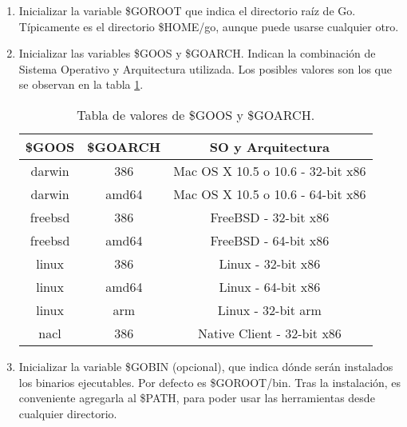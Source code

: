 	\begin{enumerate} 
		\item Inicializar la variable \$GOROOT que indica el directorio raíz de Go. 
		Típicamente es el directorio \$HOME/go, aunque puede usarse cualquier otro.
		\item Inicializar las variables \$GOOS y \$GOARCH. Indican la
		combinación de Sistema Operativo y Arquitectura utilizada. Los posibles
		valores son los que se observan en la tabla \ref{Tabla_entorno}.
	
		\begin{table}[] 
			\begin{center} 
				\begin{tabular}{ccc} 
					\textbf{\$GOOS}	& \textbf{\$GOARCH} & \textbf{SO y Arquitectura}\\
					\hline 
					darwin & 386 & Mac OS X 10.5 o 10.6 -  32-bit x86\\
					darwin & amd64 & Mac OS X 10.5 o 10.6 - 64-bit x86\\ 
					freebsd & 386 & FreeBSD - 32-bit x86\\
					freebsd & amd64	& FreeBSD - 64-bit x86\\
					linux & 386 & Linux - 32-bit x86\\ 
					linux & amd64 & Linux - 64-bit x86\\
					linux & arm & Linux - 32-bit arm\\
					nacl & 386 & Native Client - 32-bit x86\\
				\end{tabular} 
			\end{center}
			\caption{Tabla de valores de \$GOOS y \$GOARCH.\label{Tabla_entorno}} 
		\end{table}
	
		\item Inicializar la variable \$GOBIN (opcional), que indica dónde serán
		instalados los binarios ejecutables. Por defecto es \$GOROOT/bin. Tras la
		instalación, es conveniente agregarla al \$PATH, para poder usar las
		herramientas desde cualquier directorio. 
	\end{enumerate}


